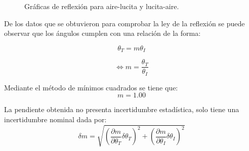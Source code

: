 \documentclass[DIV=calc, paper=a4, fontsize=11pt]{scrartcl}
\begin{document}
\begin{figure}[h!]
 \centering
    \caption{Gráficas de reflexión para aire-lucita y lucita-aire.}
     \label{f:Lambert3}
\end{figure}

De los datos que se obtuvieron para comprobar la ley de la reflexión se puede observar que los ángulos cumplen con una relación de la forma:

\begin{equation*}
   \theta_{T}=m\theta_{I}
\end{equation*}

\begin{equation*}
  \iff m= \frac{\theta_{T}}{\theta_{I}}
\end{equation*}

Mediante el método de mínimos cuadrados se tiene que:
\begin{equation*}
    m = 1.00
\end{equation*}

La pendiente obtenida no presenta incertidumbre estadística, solo tiene una incertidumbre nominal dada por:
\begin{equation*}
   \delta m=\sqrt{\left( \frac{\partial m}{\partial \theta_{T}} \delta \theta_{T}\right)^2 +\left( \frac{\partial m}{\partial \theta_{I}} \delta \theta_{I}\right)^2 }
\end{equation*}
\end{document}
